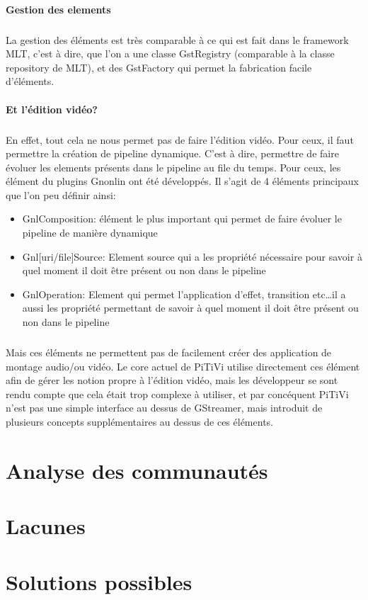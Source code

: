 \paragraph{Gestion des elements}

\subparagraph{}

La gestion des éléments est très comparable à ce qui est fait
dans le framework MLT, c'est à dire, que l'on a une classe GstRegistry
(comparable à la classe repository de MLT), et des GstFactory qui permet
la fabrication facile d'éléments.

\paragraph{Et l'édition vidéo?}

\subparagraph{}

En effet, tout cela ne nous permet pas de faire l'édition vidéo. Pour
ceux, il faut permettre la création de pipeline dynamique. C'est
à dire, permettre de faire évoluer les elements présents dans le
pipeline au file du temps.  Pour ceux, les élément du plugins Gnonlin
ont été développés. Il s'agit de 4 éléments principaux que l'on
peu définir ainsi:

\begin{itemize}

  \item {GnlComposition: élément le plus important qui permet de
  faire évoluer
    le pipeline de manière dynamique}

  \item{Gnl[uri/file]Source: Element source qui a les propriété
    nécessaire pour savoir à quel moment il doit être présent ou
    non dans le pipeline}

  \item{GnlOperation: Element qui permet l'application d'effet, transition
    etc\ldots il a aussi les propriété permettant de savoir à quel moment il
    doit être présent ou non dans le pipeline}

\end{itemize}

\subparagraph{}

Mais ces éléments ne permettent pas de facilement créer des application de
montage audio/ou vidéo. Le core actuel de PiTiVi utilise directement ces
élément afin de gérer les notion propre à l'édition vidéo, mais les développeur
se sont rendu compte que cela était trop complexe à utiliser, et par concéquent
PiTiVi n'est pas une simple interface au dessus de GStreamer, mais introduit de
plusieurs concepts supplémentaires au dessus de ces éléments.

\newpage \section{Analyse des communautés}

\newpage \section{Lacunes}

\newpage \section{Solutions possibles}
